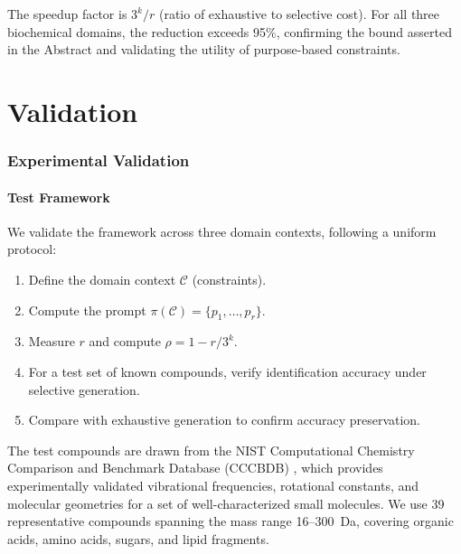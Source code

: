 \documentclass[11pt,twocolumn,a4paper]{article}
\theoremstyle{definition}
\theoremstyle{remark}
\newcommand{\Context}{\mathcal{C}}
\newcommand{\Prompt}{\pi}
\begin{document}
The speedup factor is $3^k / r$ (ratio of exhaustive to selective cost). For all three biochemical domains, the reduction exceeds 95\%, confirming the bound asserted in the Abstract and validating the utility of purpose-based constraints.

\part{Validation}\label{part:validation}

\section{Experimental Validation}\label{sec:validation}

\subsection{Test Framework}\label{sec:test-framework}

We validate the framework across three domain contexts, following a uniform protocol:
\begin{enumerate}[label=\textbf{V\arabic*:}]
  \item Define the domain context $\Context$ (constraints).
  \item Compute the prompt $\Prompt(\Context) = \{p_1, \ldots, p_r\}$.
  \item Measure $r$ and compute $\rho = 1 - r/3^k$.
  \item For a test set of known compounds, verify identification accuracy under selective generation.
  \item Compare with exhaustive generation to confirm accuracy preservation.
\end{enumerate}

The test compounds are drawn from the NIST Computational Chemistry Comparison and Benchmark Database (CCCBDB) \citep{linstrom2023}, which provides experimentally validated vibrational frequencies, rotational constants, and molecular geometries for a set of well-characterized small molecules. We use 39 representative compounds spanning the mass range 16--300~Da, covering organic acids, amino acids, sugars, and lipid fragments.
\end{document}
